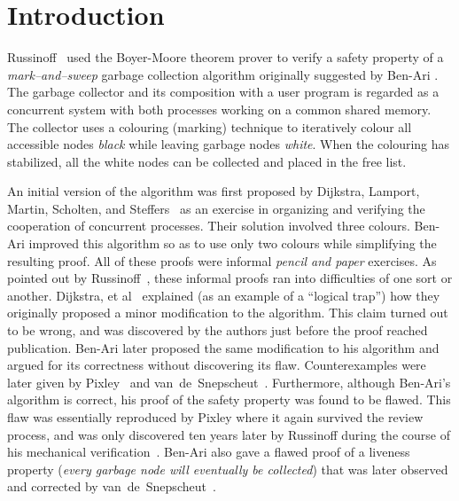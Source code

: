          
\section{Introduction}

Russinoff~\cite{Rus:GC} used   the Boyer-Moore theorem prover  to
verify  a  safety  property   of   a {\em  mark--and--sweep}   garbage
collection  algorithm originally suggested  by Ben-Ari \cite{Ben:GC}. 
The garbage collector and   its composition with   a user  program  is
regarded as a concurrent system with both processes working on
a common shared memory.  The  collector uses a colouring  (marking) technique
to iteratively colour all accessible nodes {\em black} while 
leaving garbage nodes {\em white}.  When the colouring has
stabilized, all the white nodes can be collected and placed in the
free list.

An initial  version of the algorithm  was  first proposed by Dijkstra,
Lamport, Martin, Scholten, and Steffers~\cite{DLMSS:GC} as an exercise
in  organizing and verifying the cooperation  of concurrent processes. 
Their solution   involved   three  colours.   Ben-Ari    improved this
algorithm so  as  to use    only  two colours  while  simplifying  the
resulting proof.  All of these  proofs were  informal {\em pencil  and
  paper\/} exercises.  As   pointed  out by   Russinoff~\cite{Rus:GC},
these informal proofs  ran into difficulties  of one sort or  another. 
Dijkstra, et al~\cite{DLMSS:GC}    explained   (as an  example  of   a
``logical trap'') how they originally proposed a minor modification to
the  algorithm.   This claim turned   out  to   be  wrong, and  was
discovered by the authors just  before the proof reached publication.  
Ben-Ari  later  proposed the same  modification   to his algorithm and
argued for   its    correctness   without  discovering its       flaw. 
Counterexamples    were  later  given    by  Pixley~\cite{Pix:GC}  and
van~de~Snepscheut~\cite{Van:GC}.   Furthermore,  although    Ben-Ari's
algorithm 
is correct, his proof of
the safety property was found to be flawed.  This flaw was essentially
reproduced by Pixley \cite{Pix:GC} where it  again survived the  review
process, and was only discovered  ten years later by Russinoff  during
the course of his mechanical verification~\cite{Rus:GC}.  Ben-Ari also
gave a flawed  proof of a liveness  property ({\em every garbage  node
  will eventually be collected}) that was later observed and corrected
by van~de~Snepscheut~\cite{Van:GC}.

